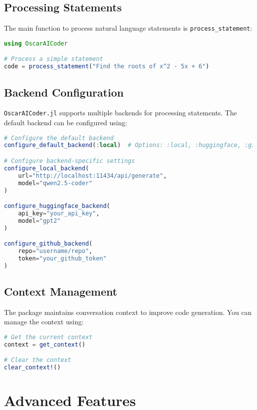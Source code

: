 \documentclass[11pt,a4paper]{article}
\newcommand{\func}[1]{\texttt{#1}}
\newcommand{\modname}[1]{\texttt{#1}}
\begin{document}
\subsection{Processing Statements}

The main function to process natural language statements is \func{process\_statement}:

\begin{lstlisting}[language=Julia]
using OscarAICoder

# Process a simple statement
code = process_statement("Find the roots of x^2 - 5x + 6")
\end{lstlisting}

\subsection{Backend Configuration}

\modname{OscarAICoder.jl} supports multiple backends for processing statements. The default backend can be configured using:

\begin{lstlisting}[language=Julia]
# Configure the default backend
configure_default_backend(:local)  # Options: :local, :huggingface, :github

# Configure backend-specific settings
configure_local_backend(
    url="http://localhost:11434/api/generate",
    model="qwen2.5-coder"
)

configure_huggingface_backend(
    api_key="your_api_key",
    model="gpt2"
)

configure_github_backend(
    repo="username/repo",
    token="your_github_token"
)
\end{lstlisting}

\subsection{Context Management}

The package maintains conversation context to improve code generation. You can manage the context using:

\begin{lstlisting}[language=Julia]
# Get the current context
context = get_context()

# Clear the context
clear_context!()
\end{lstlisting}

\section{Advanced Features}
\label{sec:advanced-features}
\end{document}
